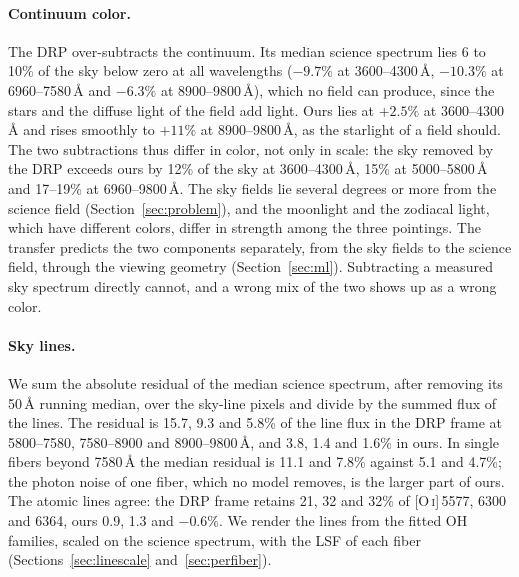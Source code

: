 \paragraph{Continuum color.} The DRP over-subtracts the continuum. Its median
science spectrum lies 6 to 10\% of the sky below zero at all wavelengths
($-9.7\%$ at 3600--4300\,\AA, $-10.3\%$ at 6960--7580\,\AA{} and $-6.3\%$ at
8900--9800\,\AA), which no field can produce, since the stars and the diffuse
light of the field add light. Ours lies at $+2.5\%$ at 3600--4300\,\AA{} and
rises smoothly to $+11\%$ at 8900--9800\,\AA, as the starlight of a field
should. The two subtractions thus differ in color, not only in scale: the sky
removed by the DRP exceeds ours by 12\% of the sky at 3600--4300\,\AA, 15\% at
5000--5800\,\AA{} and 17--19\% at 6960--9800\,\AA. The sky fields lie several
degrees or more from the science field (Section~\ref{sec:problem}), and the
moonlight and the zodiacal light, which have different colors, differ in
strength among the three pointings. The transfer predicts the two components
separately, from the sky fields to the science field, through the viewing
geometry (Section~\ref{sec:ml}). Subtracting a measured sky spectrum directly
cannot, and a wrong mix of the two shows up as a wrong color.

\paragraph{Sky lines.} We sum the absolute residual of the median science
spectrum, after removing its 50\,\AA{} running median, over the sky-line pixels
and divide by the summed flux of the lines. The residual is 15.7, 9.3 and
5.8\% of the line flux in the DRP frame at 5800--7580, 7580--8900 and
8900--9800\,\AA, and 3.8, 1.4 and 1.6\% in ours. In single fibers beyond
7580\,\AA{} the median residual is 11.1 and 7.8\% against 5.1 and 4.7\%; the
photon noise of one fiber, which no model removes, is the larger part of ours.
The atomic lines agree: the DRP frame retains 21, 32 and 32\% of
[O\,\textsc{i}]\,5577, 6300 and 6364, ours 0.9, 1.3 and $-0.6\%$. We render
the lines from the fitted OH families, scaled on the science spectrum, with the
LSF of each fiber (Sections~\ref{sec:linescale} and~\ref{sec:perfiber}).

